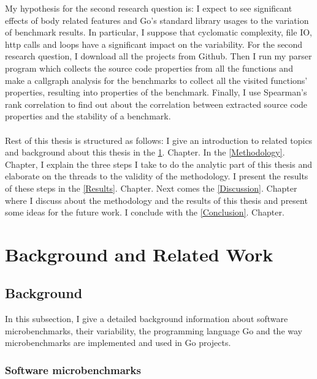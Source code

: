 \documentclass{seal_thesis}
\begin{document}
\noindent My hypothesis for the second research question is: I expect to see significant effects of body related features and Go's standard library usages to the variation of benchmark results. In particular, I suppose that cyclomatic complexity, file IO, http calls and loops have a significant impact on the variability. For the second research question, I download all the projects from Github. Then I run my parser program which collects the source code properties from all the functions and make a callgraph analysis for the benchmarks to collect all the visited functions' properties, resulting into properties of the benchmark. Finally, I use Spearman's rank correlation to find out about the correlation between extracted source code properties and the stability of a benchmark.\\
\\
Rest of this thesis is structured as follows: I give an introduction to related topics and background about this thesis in the \ref{Background and Related Work}. Chapter. In the \ref{Methodology}. Chapter, I explain the three steps I take to do the analytic part of this thesis and elaborate on the threads to the validity of the methodology. I present the results of these steps in the \ref{Results}. Chapter. Next comes the \ref{Discussion}. Chapter where I discuss about the methodology and the results of this thesis and present some ideas for the future work. I conclude with the \ref{Conclusion}. Chapter.

\chapter{Background and Related Work}
\label{Background and Related Work}

\section{Background}

In this subsection, I give a detailed background information about software microbenchmarks, their variability, the programming language Go and the way microbenchmarks are implemented and used in Go projects.

\subsection{Software microbenchmarks}
\end{document}
